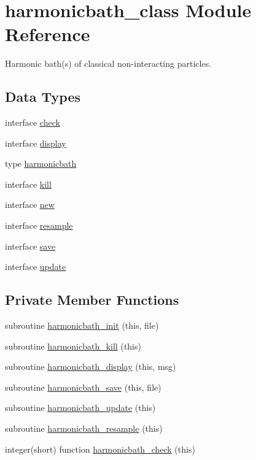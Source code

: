 \hypertarget{classharmonicbath__class}{\section{harmonicbath\+\_\+class Module Reference}
\label{classharmonicbath__class}
}


Harmonic bath(s) of classical non-\/interacting particles.  


\subsection*{Data Types}
\begin{DoxyCompactItemize}
\item 
interface \hyperlink{interfaceharmonicbath__class_1_1check}{check}
\item 
interface \hyperlink{interfaceharmonicbath__class_1_1display}{display}
\item 
type \hyperlink{structharmonicbath__class_1_1harmonicbath}{harmonicbath}
\item 
interface \hyperlink{interfaceharmonicbath__class_1_1kill}{kill}
\item 
interface \hyperlink{interfaceharmonicbath__class_1_1new}{new}
\item 
interface \hyperlink{interfaceharmonicbath__class_1_1resample}{resample}
\item 
interface \hyperlink{interfaceharmonicbath__class_1_1save}{save}
\item 
interface \hyperlink{interfaceharmonicbath__class_1_1update}{update}
\end{DoxyCompactItemize}
\subsection*{Private Member Functions}
\begin{DoxyCompactItemize}
\item 
subroutine \hyperlink{classharmonicbath__class_a7d869bb99a49aa520fe606e808d5feb5}{harmonicbath\+\_\+init} (this, file)
\item 
subroutine \hyperlink{classharmonicbath__class_ae4e0e1b027594bb77034f21e82f6ed63}{harmonicbath\+\_\+kill} (this)
\item 
subroutine \hyperlink{classharmonicbath__class_af4ce5a2a61231e5612ff243262e9f993}{harmonicbath\+\_\+display} (this, msg)
\item 
subroutine \hyperlink{classharmonicbath__class_a9dfb6e87e69957fcc4ec907135931ace}{harmonicbath\+\_\+save} (this, file)
\item 
subroutine \hyperlink{classharmonicbath__class_ac930ca08461d767f4593374465c7229d}{harmonicbath\+\_\+update} (this)
\item 
subroutine \hyperlink{classharmonicbath__class_a6b27afcc7c1f24fec82adf3177d0adb8}{harmonicbath\+\_\+resample} (this)
\item 
integer(short) function \hyperlink{classharmonicbath__class_abde7a862edc5c843e0665c6a6705bd74}{harmonicbath\+\_\+check} (this)
\end{DoxyCompactItemize}


